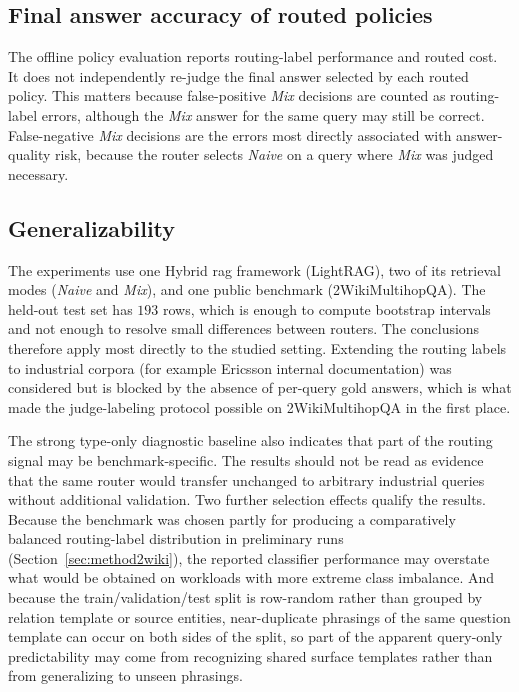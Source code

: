 \documentclass[english, bibtex]{kththesis}               %
\numberwithin{listing}{chapter}
\begin{document}
\subsection{Final answer accuracy of routed policies}
\label{sec:limitFinalAnswerAccuracy}

The offline policy evaluation reports routing-label performance and routed cost. It does not independently re-judge the final answer selected by each routed policy. This matters because false-positive \emph{Mix} decisions are counted as routing-label errors, although the \emph{Mix} answer for the same query may still be correct. False-negative \emph{Mix} decisions are the errors most directly associated with answer-quality risk, because the router selects \emph{Naive} on a query where \emph{Mix} was judged necessary.

\subsection{Generalizability}
\label{sec:limitGeneralizability}

The experiments use one Hybrid \gls{rag} framework (LightRAG), two of its retrieval modes (\emph{Naive} and \emph{Mix}), and one public benchmark (2WikiMultihopQA). The held-out test set has $193$ rows, which is enough to compute bootstrap intervals and not enough to resolve small differences between routers. The conclusions therefore apply most directly to the studied setting. Extending the routing labels to industrial corpora (for example Ericsson internal documentation) was considered but is blocked by the absence of per-query gold answers, which is what made the judge-labeling protocol possible on 2WikiMultihopQA in the first place.

The strong type-only diagnostic baseline also indicates that part of the routing signal may be benchmark-specific. The results should not be read as evidence that the same router would transfer unchanged to arbitrary industrial queries without additional validation. Two further selection effects qualify the results. Because the benchmark was chosen partly for producing a comparatively balanced routing-label distribution in preliminary runs (Section~\ref{sec:method2wiki}), the reported classifier performance may overstate what would be obtained on workloads with more extreme class imbalance. And because the train/validation/test split is row-random rather than grouped by relation template or source entities, near-duplicate phrasings of the same question template can occur on both sides of the split, so part of the apparent query-only predictability may come from recognizing shared surface templates rather than from generalizing to unseen phrasings.
\end{document}
